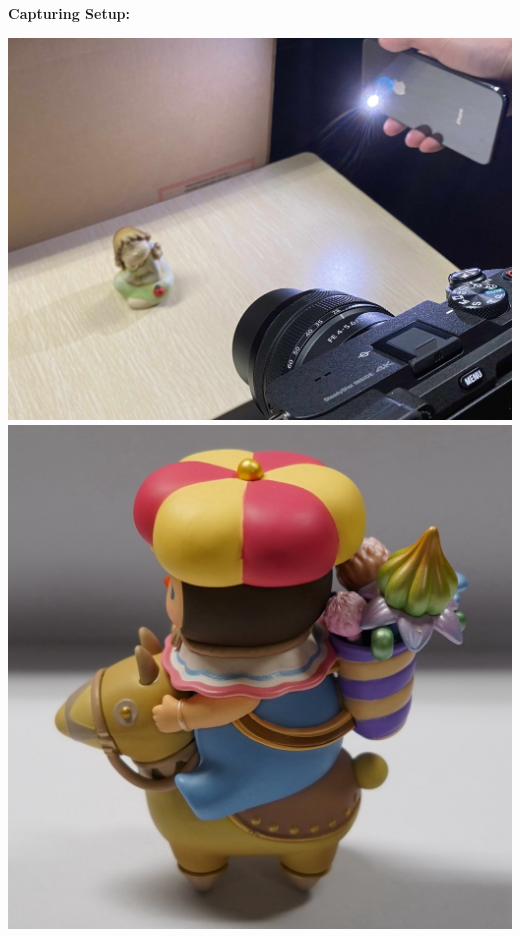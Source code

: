\documentclass[landscape,a0paper,fontscale=0.292]{baposter}
\begin{document}
\begin{poster}
{\begin{minipage}[t]{0.49\textwidth}
        
        \def\realheight{0.22\textwidth}
        \vspace{-0.5em}
        \begin{minipage}[t]{0.58\textwidth}
        \textbf{\color{ctitle}Capturing Setup:} \\
        \vspace{-1.5em}
        \begin{center}
            \includegraphics[align=c,height=\realheight]{images/showcase/setup.jpg}
            \hfill
            \includegraphics[align=c,height=\realheight]{images/showcase/botanist_left.jpg}

\end{center}
\end{minipage}
\end{minipage}}
\end{poster}
\end{document}
